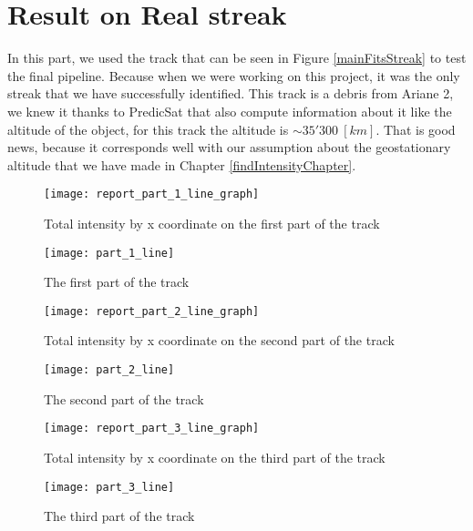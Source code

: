 \documentclass[a4paper,12pt,oneside]{report}
\begin{document}
\section{Result on Real streak}
In this part, we used the track that can be seen in Figure \ref{mainFitsStreak} to test the final pipeline. Because when we were working
on this project, it was the only streak that we have successfully identified. This track is a debris from Ariane 2, we knew it thanks to
PredicSat that also compute information about it like the altitude of the object, for this track the altitude is $\sim 35'300\ [km]$. That
is good news, because it corresponds well with our assumption about the geostationary altitude that we have made in Chapter \ref{findIntensityChapter}.
\begin{figure}[h]
    \begin{minipage}[c]{.47\linewidth}
        \centering
        \texttt{[image: report\_part\_1\_line\_graph]}
        \caption{Total intensity by x coordinate on the first part of the track}
        \label{graphPart1Track}
    \end{minipage}
    \hfill
    \begin{minipage}[c]{.47\linewidth}
        \centering
        \texttt{[image: part\_1\_line]}
        \caption{The first part of the track}
    \end{minipage}
\end{figure}
\hfill
\begin{figure}[h]
    \begin{minipage}[c]{.47\linewidth}
        \centering
        \texttt{[image: report\_part\_2\_line\_graph]}
        \caption{Total intensity by x coordinate on the second part of the track}
        \label{graphPart2Track}
    \end{minipage}
    \hfill
    \begin{minipage}[c]{.47\linewidth}
        \centering
        \texttt{[image: part\_2\_line]}
        \caption{The second part of the track}
    \end{minipage}
\end{figure}
\begin{figure}[h]
    \begin{minipage}[c]{.47\linewidth}
        \centering
        \texttt{[image: report\_part\_3\_line\_graph]}
        \caption{Total intensity by x coordinate on the third part of the track}
        \label{graphPart3Track}
    \end{minipage}
    \hfill
    \begin{minipage}[c]{.47\linewidth}
        \centering
        \texttt{[image: part\_3\_line]}
        \caption{The third part of the track}
    \end{minipage}
\end{figure}
\end{document}
